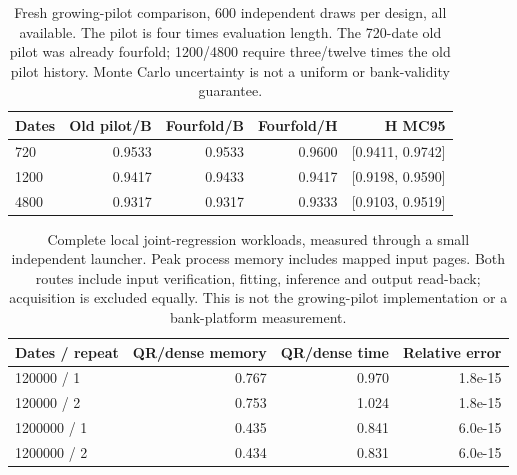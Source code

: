\begin{table}[htbp]\centering\small
\begin{tabular}{lrrrr}
\toprule
Dates & Old pilot/B & Fourfold/B & Fourfold/H & H MC95\\\midrule
720 & 0.9533 & 0.9533 & 0.9600 & [0.9411, 0.9742]\\
1200 & 0.9417 & 0.9433 & 0.9417 & [0.9198, 0.9590]\\
4800 & 0.9317 & 0.9317 & 0.9333 & [0.9103, 0.9519]\\
\bottomrule\end{tabular}
\caption{Fresh growing-pilot comparison, 600 independent draws per design, all available. The pilot is four times evaluation length. The 720-date old pilot was already fourfold; 1200/4800 require three/twelve times the old pilot history. Monte Carlo uncertainty is not a uniform or bank-validity guarantee.}
\label{v9:followup-table}
\end{table}

\begin{table}[htbp]\centering\small
\begin{tabular}{lrrr}
\toprule
Dates / repeat & QR/dense memory & QR/dense time & Relative error\\\midrule
120000 / 1 & 0.767 & 0.970 & 1.8e-15\\
120000 / 2 & 0.753 & 1.024 & 1.8e-15\\
1200000 / 1 & 0.435 & 0.841 & 6.0e-15\\
1200000 / 2 & 0.434 & 0.831 & 6.0e-15\\
\bottomrule\end{tabular}
\caption{Complete local joint-regression workloads, measured through a small independent launcher. Peak process memory includes mapped input pages. Both routes include input verification, fitting, inference and output read-back; acquisition is excluded equally. This is not the growing-pilot implementation or a bank-platform measurement.}
\label{v9:workload-table}
\end{table}
